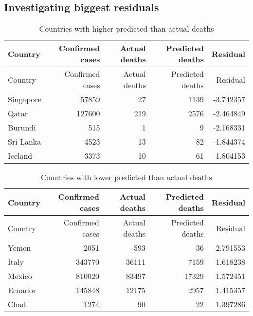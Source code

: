\documentclass[
]{article}
\begin{document}
\newpage

\hypertarget{investigating-biggest-residuals}{%
\subsection{Investigating biggest
residuals}\label{investigating-biggest-residuals}}

\begin{longtable}[]{@{}lrrrr@{}}
\caption{Countries with higher predicted than actual
deaths}\tabularnewline
\toprule
Country & Confirmed cases & Actual deaths & Predicted deaths &
Residual\tabularnewline
\midrule
\endfirsthead
\toprule
Country & Confirmed cases & Actual deaths & Predicted deaths &
Residual\tabularnewline
\midrule
\endhead
Singapore & 57859 & 27 & 1139 & -3.742357\tabularnewline
Qatar & 127600 & 219 & 2576 & -2.464849\tabularnewline
Burundi & 515 & 1 & 9 & -2.168331\tabularnewline
Sri Lanka & 4523 & 13 & 82 & -1.844374\tabularnewline
Iceland & 3373 & 10 & 61 & -1.804153\tabularnewline
\bottomrule
\end{longtable}

\begin{longtable}[]{@{}lrrrr@{}}
\caption{Countries with lower predicted than actual
deaths}\tabularnewline
\toprule
Country & Confirmed cases & Actual deaths & Predicted deaths &
Residual\tabularnewline
\midrule
\endfirsthead
\toprule
Country & Confirmed cases & Actual deaths & Predicted deaths &
Residual\tabularnewline
\midrule
\endhead
Yemen & 2051 & 593 & 36 & 2.791553\tabularnewline
Italy & 343770 & 36111 & 7159 & 1.618238\tabularnewline
Mexico & 810020 & 83497 & 17329 & 1.572451\tabularnewline
Ecuador & 145848 & 12175 & 2957 & 1.415357\tabularnewline
Chad & 1274 & 90 & 22 & 1.397286\tabularnewline
\bottomrule
\end{longtable}
\end{document}
